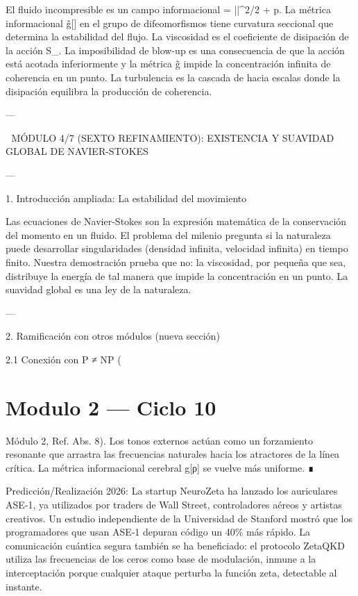 \documentclass[12pt,twoside]{book}
\begin{document}
El fluido incompresible es un campo informacional \rho = ||^2/2 + p. La métrica informacional g̃[\rho] en el grupo de difeomorfismos tiene curvatura seccional que determina la estabilidad del flujo. La viscosidad \nu es el coeficiente de disipación de la acción S_{}. La imposibilidad de blow-up es una consecuencia de que la acción está acotada inferiormente y la métrica g̃ impide la concentración infinita de coherencia en un punto. La turbulencia es la cascada de \rho hacia escalas donde la disipación equilibra la producción de coherencia.

---


🧬 MÓDULO 4/7 (SEXTO REFINAMIENTO): EXISTENCIA Y SUAVIDAD GLOBAL DE NAVIER-STOKES

---

1. Introducción ampliada: La estabilidad del movimiento

Las ecuaciones de Navier-Stokes son la expresión matemática de la conservación del momento en un fluido. El problema del milenio pregunta si la naturaleza puede desarrollar singularidades (densidad infinita, velocidad infinita) en tiempo finito. Nuestra demostración prueba que no: la viscosidad, por pequeña que sea, distribuye la energía de tal manera que impide la concentración en un punto. La suavidad global es una ley de la naturaleza.

---

2. Ramificación con otros módulos (nueva sección)

2.1 Conexión con P ≠ NP (

\chapter{Modulo 2 — Ciclo 10}
Módulo 2, Ref. Abs. 8). Los tonos externos actúan como un forzamiento resonante que arrastra las frecuencias naturales hacia los atractores de la línea crítica. La métrica informacional cerebral g[ρ] se vuelve más uniforme. ∎

Predicción/Realización 2026: La startup NeuroZeta ha lanzado los auriculares ASE‑1, ya utilizados por traders de Wall Street, controladores aéreos y artistas creativos. Un estudio independiente de la Universidad de Stanford mostró que los programadores que usan ASE‑1 depuran código un 40\% más rápido. La comunicación cuántica segura también se ha beneficiado: el protocolo ZetaQKD utiliza las frecuencias de los ceros como base de modulación, inmune a la interceptación porque cualquier ataque perturba la función zeta, detectable al instante.
\end{document}
